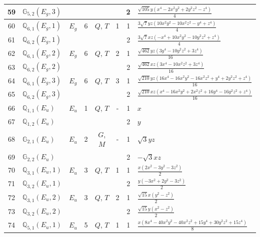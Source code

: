 \documentclass[fleqn,10pt,landscape]{jsarticle}
\begin{document}
\begin{longtable}[l]{clcccccl}
59 & $\mathbb{G}_{5,2}(E_{g},3)$ &  &  &  &  & 2 & $\frac{\sqrt{105} y \left(x^{4} - 2 x^{2} y^{2} + 2 y^{2} z^{2} - z^{4}\right)}{4}$ \\ \hline
60 & $\mathbb{Q}_{6,1}(E_{g},1)$ & $E_{g}$ & 6 & $Q$, $T$ & 1 & 1 & $\frac{3 \sqrt{7} y z \left(10 x^{2} y^{2} - 10 x^{2} z^{2} - y^{4} + z^{4}\right)}{4}$ \\
61 & $\mathbb{Q}_{6,2}(E_{g},1)$ &  &  &  &  & 2 & $\frac{3 \sqrt{7} x z \left(- x^{4} + 10 x^{2} y^{2} - 10 y^{2} z^{2} + z^{4}\right)}{4}$ \\ \hline
62 & $\mathbb{Q}_{6,1}(E_{g},2)$ & $E_{g}$ & 6 & $Q$, $T$ & 2 & 1 & $\frac{\sqrt{462} y z \left(3 y^{4} - 10 y^{2} z^{2} + 3 z^{4}\right)}{16}$ \\
63 & $\mathbb{Q}_{6,2}(E_{g},2)$ &  &  &  &  & 2 & $\frac{\sqrt{462} x z \left(3 x^{4} - 10 x^{2} z^{2} + 3 z^{4}\right)}{16}$ \\ \hline
64 & $\mathbb{Q}_{6,1}(E_{g},3)$ & $E_{g}$ & 6 & $Q$, $T$ & 3 & 1 & $\frac{\sqrt{210} y z \left(16 x^{4} - 16 x^{2} y^{2} - 16 x^{2} z^{2} + y^{4} + 2 y^{2} z^{2} + z^{4}\right)}{16}$ \\
65 & $\mathbb{Q}_{6,2}(E_{g},3)$ &  &  &  &  & 2 & $\frac{\sqrt{210} x z \left(x^{4} - 16 x^{2} y^{2} + 2 x^{2} z^{2} + 16 y^{4} - 16 y^{2} z^{2} + z^{4}\right)}{16}$ \\ \hline
66 & $\mathbb{Q}_{1,1}(E_{u})$ & $E_{u}$ & 1 & $Q$, $T$ & - & 1 & $x$ \\
67 & $\mathbb{Q}_{1,2}(E_{u})$ &  &  &  &  & 2 & $y$ \\ \hline
68 & $\mathbb{G}_{2,1}(E_{u})$ & $E_{u}$ & 2 & $G$, $M$ & - & 1 & $\sqrt{3} y z$ \\
69 & $\mathbb{G}_{2,2}(E_{u})$ &  &  &  &  & 2 & $- \sqrt{3} x z$ \\ \hline
70 & $\mathbb{Q}_{3,1}(E_{u},1)$ & $E_{u}$ & 3 & $Q$, $T$ & 1 & 1 & $\frac{x \left(2 x^{2} - 3 y^{2} - 3 z^{2}\right)}{2}$ \\
71 & $\mathbb{Q}_{3,2}(E_{u},1)$ &  &  &  &  & 2 & $\frac{y \left(- 3 x^{2} + 2 y^{2} - 3 z^{2}\right)}{2}$ \\ \hline
72 & $\mathbb{Q}_{3,1}(E_{u},2)$ & $E_{u}$ & 3 & $Q$, $T$ & 2 & 1 & $\frac{\sqrt{15} x \left(y^{2} - z^{2}\right)}{2}$ \\
73 & $\mathbb{Q}_{3,2}(E_{u},2)$ &  &  &  &  & 2 & $\frac{\sqrt{15} y \left(x^{2} - z^{2}\right)}{2}$ \\ \hline
74 & $\mathbb{Q}_{5,1}(E_{u},1)$ & $E_{u}$ & 5 & $Q$, $T$ & 1 & 1 & $\frac{x \left(8 x^{4} - 40 x^{2} y^{2} - 40 x^{2} z^{2} + 15 y^{4} + 30 y^{2} z^{2} + 15 z^{4}\right)}{8}$ \\

\end{longtable}
\end{document}
